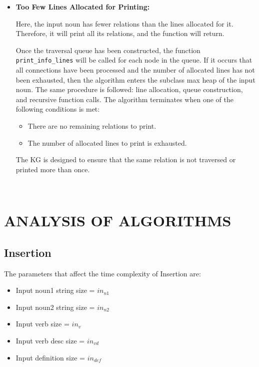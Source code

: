 \documentclass[conference]{IEEEtran}
\begin{document}
\begin{itemize}
    \item \textbf{Too Few Lines Allocated for Printing:}
    
    Here, the input noun has fewer relations than the lines allocated for it. Therefore, it will print all its relations, and the function will return. 
    
    Once the traversal queue has been constructed, the function \texttt{print\_info\_lines} will be called for each node in the queue. If it occurs that all connections have been processed and the number of allocated lines has not been exhausted, then the algorithm enters the subclass max heap of the input noun. The same procedure is followed: line allocation, queue construction, and recursive function calls. The algorithm terminates when one of the following conditions is met:
    \begin{itemize}
        \item There are no remaining relations to print.
        \item The number of allocated lines to print is exhausted.
    \end{itemize}
    
    The KG is designed to ensure that the same relation is not traversed or printed more than once.
\end{itemize}


\\






\section{ANALYSIS OF ALGORITHMS}
\subsection{Insertion}
The parameters that affect the time complexity of Insertion are:
\begin{itemize}
    \item Input noun1 string size = $in_{n1}$
    \item Input noun2 string size = $in_{n2}$
    \item Input verb size = $in_{v}$
    \item Input verb desc size = $in_{vd}$
    \item Input definition size = $in_{def}$
\end{itemize}
\end{document}

